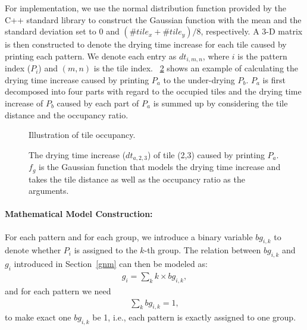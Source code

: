 For implementation,
we use the normal distribution function provided by the C++ standard library to construct the Gaussian function with the mean and the standard deviation set to $0$ and $(\#tile_x+\#tile_y)/8$,
respectively.
A 3-D matrix is then constructed to denote the drying time increase for each tile caused by printing each pattern.
We denote each entry as $dt_{i,m,n}$,
where $i$ is the pattern index ($P_i$) and $(m,n)$ is the tile index.
\figurename~\ref{fig:dryincrease} shows an example of calculating the drying time increase caused by printing $P_a$ to the under-drying $P_b$.
$P_a$ is first decomposed into four parts with regard to the occupied tiles and the drying time increase of $P_b$ caused by each part of $P_a$ is summed up by considering the tile distance and the occupancy ratio.

\begin{figure}[t]
	\fontsize{14}{14}  \selectfont
	\centerline{\resizebox{8.5cm}{!}{}}
	\caption{Illustration of tile occupancy.}
	\label{fig:occupy}
	\normalsize
\end{figure}

\begin{figure}[t]
	\fontsize{14}{14}  \selectfont
	\centerline{\resizebox{8.5cm}{!}{}}
	\caption{The drying time increase ($dt_{a,2,3}$) of tile (2,3) caused by printing $P_a$. $f_g$ is the Gaussian function that models the drying time increase and takes the tile distance as well as the occupancy ratio as the arguments.}
	\label{fig:dryincrease}
	\normalsize
\end{figure}

\paragraph{Mathematical Model Construction: }
For each pattern and for each group,
we introduce a binary variable $bg_{i,k}$ to denote whether $P_i$ is assigned to the $k$-th group.
The relation between $bg_{i,k}$ and $g_i$ introduced in Section~\ref{gnm} can then be modeled as:
\begin{align}
g_i = \sum_k k \times bg_{i,k}, \label{eq:gibgi}
\end{align}
and for each pattern we need
\begin{align}
\sum_k bg_{i,k}=1, \label{eq:bgi1}
\end{align}
to make exact one $bg_{i,k}$ be 1,
i.e., each pattern is exactly assigned to one group.

